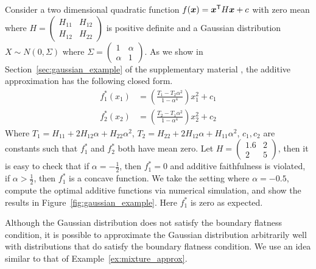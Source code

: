\begin{example}
\label{examp:gaussian_counterexample}
Consider a two dimensional quadratic function $f( \mbox{\boldmath $x$}) = \mbox{\boldmath $x$}^{\mathsf{T}} H \mbox{\boldmath $x$} + c$ with zero mean where $H = \begin{pmatrix} H_{11} & H_{12} \\ H_{12} & H_{22}\end{pmatrix}$ is positive definite and a Gaussian distribution $X \sim N(0, \Sigma)$ where $\Sigma = \begin{pmatrix}1 & \alpha \\ \alpha & 1 \end{pmatrix}$.
As we show in Section~\ref{sec:gaussian_example} of the supplementary
material \citep{supplement}, the additive approximation has the
following closed form.
\begin{align*}
f^*_1(x_1) &= \left( \frac{T_1 - T_2 \alpha^2}{1 - \alpha^4} \right) x_1^2 + c_1\\
f^*_2(x_2) &= \left( \frac{T_2 - T_1 \alpha^2}{1 - \alpha^4} \right) x_2^2 + c_2
\end{align*}
Where $T_1 = H_{11} + 2H_{12} \alpha + H_{22} \alpha^2$, $T_2 = H_{22}
+ 2H_{12} \alpha + H_{11} \alpha^2$, $c_1, c_2$ are constants such
that $f^*_1$ and $f^*_2$ both have mean zero. Let $H = \begin{pmatrix}
  1.6 & 2 \\ 2 & 5\end{pmatrix}$, then it is easy to check that if
  $\alpha = - \frac{1}{2}$, then $f^*_1 = 0$ and additive faithfulness
  is violated, if $\alpha > \frac{1}{2}$, then $f^*_1$ is a concave
  function. We take the setting where $\alpha=-0.5$, compute the
  optimal additive functions via numerical simulation, and show the
  results in Figure~\ref{fig:gaussian_example}.  Here $f^*_1$ is zero as
  expected.
\end{example}

Although the Gaussian distribution does not satisfy the boundary
flatness condition, it is possible to approximate the Gaussian
distribution arbitrarily well with distributions that do satisfy the
boundary flatness condition. We use an idea similar to that of
Example~\ref{ex:mixture_approx}.

